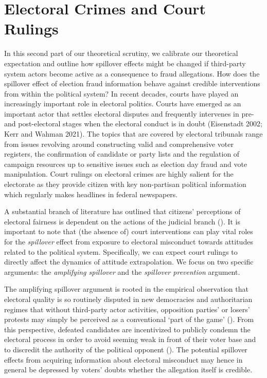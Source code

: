 \documentclass[11pt, ngerman,english,a4]{article}
\begin{document}
\section*{Electoral Crimes and Court Rulings}
In this second part of our theoretical scrutiny, we calibrate our theoretical expectation and outline how spillover effects might be changed if third-party system actors become active as a consequence to fraud allegations. How does the spillover effect of election fraud information behave against credible interventions from within the political system? In recent decades, courts have played an increasingly important role in electoral politics. Courts have emerged as an important actor that settles electoral disputes and frequently intervenes in pre- and post-electoral stages when the electoral conduct is in doubt (Eisenstadt 2002; Kerr and Wahman 2021). The topics that are covered by electoral tribunals range from issues revolving around constructing valid and comprehensive voter registers, the confirmation of candidate or party lists and the regulation of campaign resources up to sensitive issues such as election day fraud and vote manipulation. Court rulings on electoral crimes are highly salient for the electorate as they provide citizen with key non-partisan political information which regularly makes headlines in federal newspapers. %

A substantial branch of literature has outlined that citizens’ perceptions of electoral fairness is dependent on the actions of the judicial branch (\citealt{Kerr2020}). It is important to note that (the absence of) court interventions can play vital roles for the \textit{spillover} effect from exposure to electoral misconduct towards attitudes related to the political system. Specifically, we can expect court rulings to directly affect the dynamics of attitude extrapolation. We focus on two specific arguments: the \textit{amplifying spillover} and the \textit{spillover prevention} argument. 

The amplifying spillover argument is rooted in the empirical observation that electoral quality is so routinely disputed in new democracies and authoritarian regimes that without third-party actor activities, opposition parties’ or losers’ protests may simply be perceived as a conventional ‘part of the game’ (\citealt{Kerr2020}). From this perspective, defeated candidates are incentivized to publicly condemn the electoral process in order to avoid seeming weak in front of their voter base and to discredit the authority of the political opponent (\citealt{Lindberg2006}). The potential spillover effects from acquiring information about electoral misconduct may hence in general be depressed by voters’ doubts whether the allegation itself is credible. 
\end{document}
